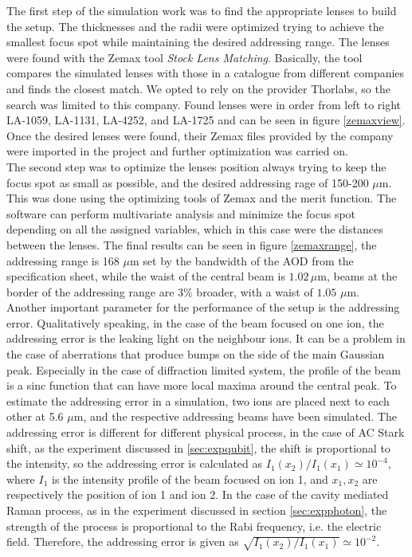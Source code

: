 The first step of the simulation work was to find the appropriate lenses to build the setup. The thicknesses and the radii were optimized trying to achieve the smallest focus spot while maintaining the desired addressing range. The lenses were found with the Zemax tool \emph{Stock Lens Matching}. Basically, the tool compares the simulated lenses with those in a catalogue from different companies and finds the closest match. We opted to rely on the provider Thorlabs, so the search was limited to this company. Found lenses were in order from left to right LA-1059, LA-1131, LA-4252, and LA-1725 and can be seen in figure \ref{zemaxview}. Once the desired lenses were found, their Zemax files provided by the company were imported in the project and further optimization was carried on.\\
The second step was to optimize the lenses position always trying to keep the focus spot as small as possible, and the desired addressing rage of 150-200 $\mu$m. This was done using the optimizing tools of Zemax and the merit function. The software can perform multivariate analysis and minimize the focus spot depending on all the assigned variables, which in this case were the distances between the lenses. The final results can be seen in figure \ref{zemaxrange}, the addressing range is 168 $\mu$m set by the bandwidth of the AOD from the specification sheet, while the waist of the central beam is $1.02\,\mu$m, beams at the border of the addressing range are $3\%$ broader, with a waist of $1.05$ $\mu$m.\\
Another important parameter for the performance of the setup is the addressing error. Qualitatively speaking, in the case of the beam focused on one ion, the addressing error is the leaking light on the neighbour ions. It can be a problem in the case of aberrations that produce bumps on the side of the main Gaussian peak. Especially in the case of diffraction limited system, the profile of the beam is a sinc function that can have more local maxima around the central peak. To estimate the addressing error in a simulation, two ions are placed next to each other at 5.6 $\mu$m, and the respective addressing beams have been simulated. The addressing error is different for different physical process, in the case of AC Stark shift, as the experiment discussed in \ref{sec:expqubit}, the shift is proportional to the intensity, so the addressing error is calculated as $I_1(x_2)/I_1(x_1) \simeq 10^{-4}$, where $I_{1}$ is the intensity profile of the beam focused on ion 1, and $x_1,x_2$ are respectively the position of ion 1 and ion 2. In the case of the cavity mediated Raman process, as in the experiment discussed in section \ref{sec:expphoton}, the strength of the process is proportional to the Rabi frequency, i.e. the electric field. Therefore, the addressing error is given as $\sqrt{I_1(x_2)/I_1(x_1)} \simeq 10^{-2}$.
